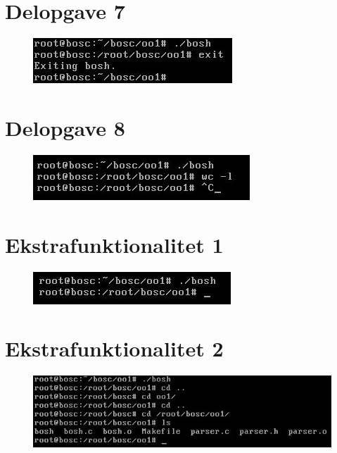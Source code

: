 \section{Delopgave 7}
\begin{figure}[!h]
\centering
\includegraphics{Images/TestOfPart7}
\label{Test7}
\end{figure}

\section{Delopgave 8}
\begin{figure}[!h]
\centering
\includegraphics{Images/TestOfPart8}
\label{Test8}
\end{figure}

\section{Ekstrafunktionalitet 1}
\begin{figure}[!h]
\centering
\includegraphics{Images/TestOfPart9}
\label{Test9}
\end{figure}

\section{Ekstrafunktionalitet 2}
\begin{figure}[!h]
\centering
\includegraphics{Images/TestOfPart10}
\label{Test10}
\end{figure}
